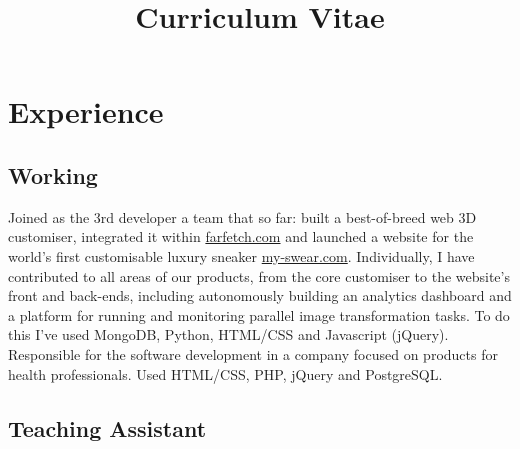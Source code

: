 \documentclass[11pt,a4paper]{moderncv}
\title{Curriculum Vitae}
\begin{document}
\maketitle

\vspace{-10mm}

\section{Experience}
\vspace{-2mm}
\subsection{Working}
{Joined as the 3rd developer a team that so far: built a best-of-breed web 3D customiser, integrated it within \href{https://www.farfetch.com/}{farfetch.com} and launched a website for the
world's first customisable luxury sneaker \href{https://www.my-swear.com/}{my-swear.com}. Individually, I have
contributed to all areas of our products, from the core
customiser to the website's front and back-ends, including autonomously building an analytics
dashboard and a platform for running and monitoring parallel image transformation tasks.
To do this I've used MongoDB, Python, HTML/CSS and Javascript (jQuery).}
{Responsible for the software development in a company focused on products for
health professionals. Used HTML/CSS, PHP, jQuery and PostgreSQL.}
\vspace{2mm}
\subsection{Teaching Assistant}
\vspace{-3mm}
\end{document}
